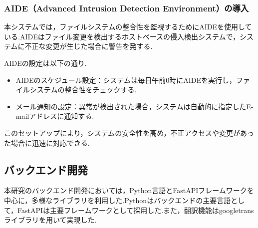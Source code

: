 \documentclass[b5paper,12pt,dvipdfmx]{jsreport}
\begin{document}
\subsubsection{AIDE（Advanced Intrusion Detection Environment）の導入}
本システムでは，ファイルシステムの整合性を監視するためにAIDEを使用している.AIDEはファイル変更を検出するホストベースの侵入検出システムで，システムに不正な変更が生じた場合に警告を発する.

AIDEの設定は以下の通り.
\begin{itemize}
    \item AIDEのスケジュール設定：システムは毎日午前0時にAIDEを実行し，ファイルシステムの整合性をチェックする.
    \item メール通知の設定：異常が検出された場合，システムは自動的に指定したE-mailアドレスに通知する.
\end{itemize}
このセットアップにより，システムの安全性を高め，不正アクセスや変更があった場合に迅速に対応できる.


\subsection{バックエンド開発}
本研究のバックエンド開発においては，Python言語とFastAPIフレームワークを中心に，多様なライブラリを利用した.Pythonはバックエンドの主要言語として，FastAPIは主要フレームワークとして採用した.また，翻訳機能はgoogletransライブラリを用いて実現した.
\end{document}
